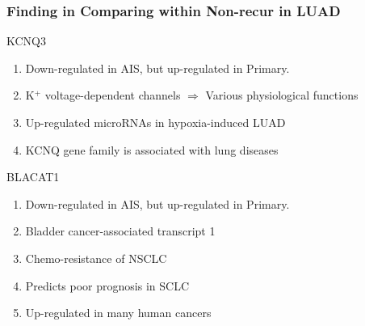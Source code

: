 \documentclass{beamer}
\begin{document}
    \begin{frame}[allowframebreaks]
        \frametitle{Finding in Comparing within Non-recur in LUAD}

        \begin{block}{KCNQ3}
            \begin{enumerate}
                \item Down-regulated in AIS, but up-regulated in Primary.
                \item K$^+$ voltage-dependent channels $\Rightarrow$ Various physiological functions \cite{KCNQ3-1, KCNQ3-2, KCNQ3-3}
                \item Up-regulated microRNAs in hypoxia-induced LUAD \cite{KCNQ3-4}
                \item KCNQ gene family is associated with lung diseases \cite{KCNQ3-5}
            \end{enumerate}
        \end{block}

        \begin{block}{BLACAT1}
            \begin{enumerate}
                \item Down-regulated in AIS, but up-regulated in Primary.
                \item Bladder cancer-associated transcript 1
                \item Chemo-resistance of NSCLC \cite{BLACAT1-1}
                \item Predicts poor prognosis in SCLC \cite{BLACAT1-2}
                \item Up-regulated in many human cancers \cite{BLACAT1-3}
            \end{enumerate}
        \end{block}
    \end{frame}
\end{document}
